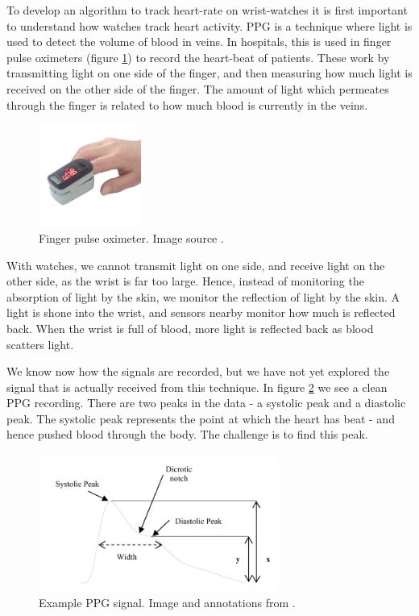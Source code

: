 \documentclass[12pt,a4paper,twoside,openany]{report}
\begin{document}
To develop an algorithm to track heart-rate on wrist-watches it is first important to
understand how watches track heart activity. PPG is a technique where light is
used to detect the volume of blood in veins. In hospitals, this is used in
finger pulse oximeters (figure \ref{fig:fingerppg}) to record the heart-beat
of patients. These work by transmitting light on one side of the finger, and
then measuring how much light is received on the other side of the finger.
The amount of light which permeates through the finger is related to how much
blood is currently in the veins.


\begin{figure}[h!]
	\centerline{\includegraphics[width=0.3\textwidth]{figs/fingerppg.jpg}}
	\caption{Finger pulse oximeter. Image source \cite{wiki:fingerppg}.}
\label{fig:fingerppg}
\end{figure}

With watches, we cannot transmit light on one side, and
receive light on the other side, as the wrist is far too large. Hence, instead
of monitoring the absorption of light by the skin, we monitor the reflection
of light by the skin. A light is shone into the wrist, and sensors nearby
monitor how much is reflected back. When the wrist is full of blood, more
light is reflected back as blood scatters light.

We know now how the signals are recorded, but we have not yet explored the
signal that is actually received from this technique. In figure
\ref{fig:typicalppgsignal} we see a
clean PPG recording. There are two peaks in the data - a systolic peak and a
diastolic peak. The systolic peak represents the point at which the heart has
beat - and hence pushed blood through the body. The challenge is to find this
peak.

\begin{figure}[h!]
	\centerline{\includegraphics[width=0.7\textwidth]{figs/typicalppgsignal.jpeg}}
	\caption{Example PPG signal. Image and annotations from \cite{elgendi12}.}
\label{fig:typicalppgsignal}
\end{figure}
\end{document}
